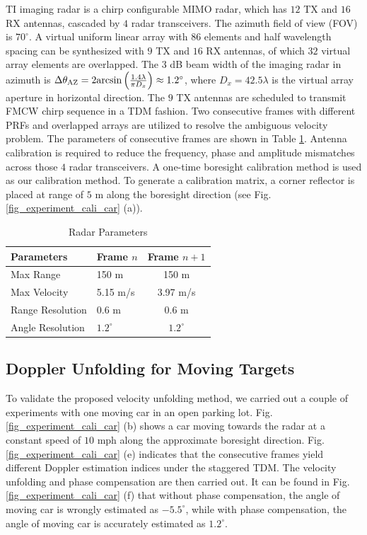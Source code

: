 \documentclass[conference]{IEEEtran}
\begin{document}
TI imaging radar is a chirp configurable MIMO radar, which has $12$ TX  and $16$ RX antennas, cascaded by $4$ radar transceivers. The azimuth field of view (FOV) is $70^\circ$. A virtual uniform linear array with $86$ elements and half wavelength spacing can be synthesized with $9$ TX and $16$ RX antennas, of which $32$ virtual array elements are overlapped.  The 3 dB beam width of the imaging radar in azimuth is $    \Delta\theta_{\rm AZ} = 2 {\rm arcsin}\left ( \frac{1.4\lambda}{\pi D_x} \right ) \approx 1.2^\circ$, where $D_x = 42.5\lambda$ is the virtual array aperture in horizontal direction. 
The $9$ TX antennas are scheduled to transmit FMCW chirp sequence in a TDM fashion. Two consecutive frames with different PRFs and overlapped arrays are utilized to resolve the ambiguous velocity problem. The parameters of consecutive frames are shown in Table \ref{table_radar_parameters}. Antenna calibration is required to reduce the frequency, phase and amplitude mismatches across those $4$ radar transceivers. A one-time boresight calibration method is used as our calibration method.
To generate a calibration matrix, a corner reflector is placed at range of $5$ m along the boresight direction  (see Fig. \ref{fig_experiment_cali_car} (a)).
\begin{table}[h]
\centering
\begin{tabular}{|l |l|c|} 
 \hline
 {\bf Parameters} & {\bf Frame $n$} & {\bf Frame $n+1$}\\%
 \hline
 Max Range & 150 m & 150 m\\ 
 \hline
 Max Velocity & 5.15 m/s & 3.97 m/s\\ 
 \hline
 Range Resolution & 0.6 m & 0.6 m\\
 \hline
 Angle Resolution & $1.2^\circ$  & $1.2^\circ$ \\ %
 \hline
\end{tabular}
\vspace{2mm}
\caption{Radar Parameters}
\label{table_radar_parameters}
\vspace{-5mm}
\end{table}








\subsection{Doppler Unfolding for Moving Targets}
To validate the proposed velocity unfolding method, we carried out a couple of experiments with one moving car in an open parking lot. Fig. \ref{fig_experiment_cali_car} (b) shows a car moving towards the radar at a constant speed of $10$ mph along the approximate boresight direction. Fig. \ref{fig_experiment_cali_car} (e)  indicates that the consecutive frames yield different Doppler estimation indices under the staggered TDM. The velocity unfolding and phase compensation are then carried out. It can be found in Fig. \ref{fig_experiment_cali_car} (f) that without phase compensation, the angle of moving car is wrongly estimated as $-5.5^\circ$, while with phase compensation, the angle of moving car is accurately estimated as $1.2^\circ$.   
\end{document}
